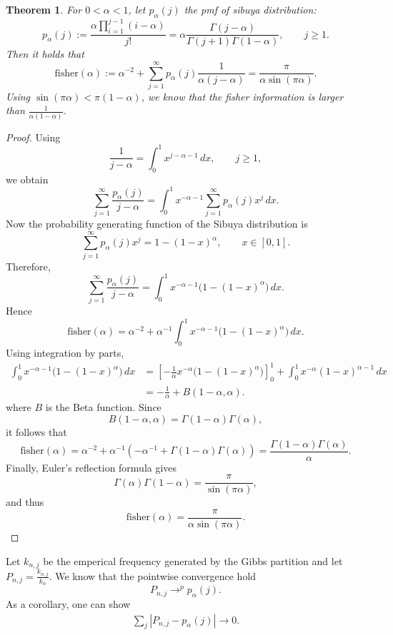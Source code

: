 \documentclass{article}
\newtheorem{theorem}{Theorem}
\begin{document}
\begin{theorem}
For $0<\alpha<1$, let $p_\alpha(j)$ the pmf of sibuya distribution:
$$
p_\alpha(j) :=\frac{\alpha\prod_{i=1}^{j-1}(i-\alpha)}{j!} = \alpha \frac{\Gamma(j-\alpha)}{\Gamma(j+1)\Gamma(1-\alpha)},
\qquad j\ge 1.
$$
Then it holds that 
$$
\mathrm{fisher}(\alpha)
:=
\alpha^{-2}
+
\sum_{j=1}^\infty p_\alpha(j)\frac{1}{\alpha(j-\alpha)}
=
\frac{\pi}{\alpha\sin(\pi\alpha)}.
$$
Using $\sin(\pi\alpha) < \pi(1-\alpha)$, we know that the fisher information is larger than $\frac{1}{\alpha(1-\alpha)}$. 
\end{theorem}


\begin{proof}
Using
$$
\frac{1}{j-\alpha}=\int_0^1 x^{j-\alpha-1}\,dx,
\qquad j\ge 1,
$$
we obtain
$$
\sum_{j=1}^\infty \frac{p_\alpha(j)}{j-\alpha}
=
\int_0^1 x^{-\alpha-1}\sum_{j=1}^\infty p_\alpha(j)x^j\,dx.
$$
Now the probability generating function of the Sibuya distribution is
$$
\sum_{j=1}^\infty p_\alpha(j)x^j
=
1-(1-x)^\alpha,
\qquad x\in[0,1].
$$
Therefore,
$$
\sum_{j=1}^\infty \frac{p_\alpha(j)}{j-\alpha}
=
\int_0^1 x^{-\alpha-1}\bigl(1-(1-x)^\alpha\bigr)\,dx.
$$
Hence
$$
\mathrm{fisher}(\alpha)
=
\alpha^{-2}
+
\alpha^{-1}\int_0^1 x^{-\alpha-1}\bigl(1-(1-x)^\alpha\bigr)\,dx.
$$
Using integration by parts, 
\begin{align*}
\int_0^1 x^{-\alpha-1}\bigl(1-(1-x)^\alpha\bigr)\,dx
&=
\left[
-\frac{1}{\alpha}x^{-\alpha}\bigl(1-(1-x)^\alpha\bigr)
\right]_0^1
+
\int_0^1 x^{-\alpha}(1-x)^{\alpha-1}\,dx \\
&=
-\frac{1}{\alpha}
+
B(1-\alpha,\alpha).
\end{align*}
where $B$ is the Beta function. 
Since
$$
B(1-\alpha,\alpha)=\Gamma(1-\alpha)\Gamma(\alpha),
$$
it follows that
$$
\mathrm{fisher}(\alpha)
=
\alpha^{-2}
+
\alpha^{-1}\left(
-\alpha^{-1}+\Gamma(1-\alpha)\Gamma(\alpha)
\right)
=
\frac{\Gamma(1-\alpha)\Gamma(\alpha)}{\alpha}.
$$
Finally, Euler's reflection formula gives
$$
\Gamma(\alpha)\Gamma(1-\alpha)=\frac{\pi}{\sin(\pi\alpha)},
$$
and thus
$$
\mathrm{fisher}(\alpha)
=
\frac{\pi}{\alpha\sin(\pi\alpha)}.
$$
\end{proof}

\newpage

Let $k_{n,j}$ be the emperical frequency generated by the Gibbs partition and let $P_{n,j}=\frac{k_{n,j}}{k_n}$. We know that the pointwise convergence hold
$$
P_{n,j}\to^p p_\alpha(j).
$$
As a corollary, one can show
\begin{align}\label{eq:bounded}
    \sum_{j} |P_{n,j} - p_{\alpha}(j)| \to 0. 
\end{align}
\end{document}
